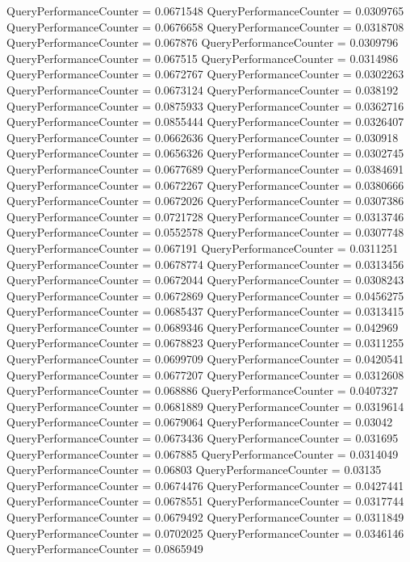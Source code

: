 \documentclass[9pt]{article}
\theoremstyle{plain}
\theoremstyle{definition}
\theoremstyle{remark}
\numberwithin{equation}{section}
\begin{document}
QueryPerformanceCounter  =  0.0671548
QueryPerformanceCounter  =  0.0309765
QueryPerformanceCounter  =  0.0676658
QueryPerformanceCounter  =  0.0318708
QueryPerformanceCounter  =  0.067876
QueryPerformanceCounter  =  0.0309796
QueryPerformanceCounter  =  0.067515
QueryPerformanceCounter  =  0.0314986
QueryPerformanceCounter  =  0.0672767
QueryPerformanceCounter  =  0.0302263
QueryPerformanceCounter  =  0.0673124
QueryPerformanceCounter  =  0.038192
QueryPerformanceCounter  =  0.0875933
QueryPerformanceCounter  =  0.0362716
QueryPerformanceCounter  =  0.0855444
QueryPerformanceCounter  =  0.0326407
QueryPerformanceCounter  =  0.0662636
QueryPerformanceCounter  =  0.030918
QueryPerformanceCounter  =  0.0656326
QueryPerformanceCounter  =  0.0302745
QueryPerformanceCounter  =  0.0677689
QueryPerformanceCounter  =  0.0384691
QueryPerformanceCounter  =  0.0672267
QueryPerformanceCounter  =  0.0380666
QueryPerformanceCounter  =  0.0672026
QueryPerformanceCounter  =  0.0307386
QueryPerformanceCounter  =  0.0721728
QueryPerformanceCounter  =  0.0313746
QueryPerformanceCounter  =  0.0552578
QueryPerformanceCounter  =  0.0307748
QueryPerformanceCounter  =  0.067191
QueryPerformanceCounter  =  0.0311251
QueryPerformanceCounter  =  0.0678774
QueryPerformanceCounter  =  0.0313456
QueryPerformanceCounter  =  0.0672044
QueryPerformanceCounter  =  0.0308243
QueryPerformanceCounter  =  0.0672869
QueryPerformanceCounter  =  0.0456275
QueryPerformanceCounter  =  0.0685437
QueryPerformanceCounter  =  0.0313415
QueryPerformanceCounter  =  0.0689346
QueryPerformanceCounter  =  0.042969
QueryPerformanceCounter  =  0.0678823
QueryPerformanceCounter  =  0.0311255
QueryPerformanceCounter  =  0.0699709
QueryPerformanceCounter  =  0.0420541
QueryPerformanceCounter  =  0.0677207
QueryPerformanceCounter  =  0.0312608
QueryPerformanceCounter  =  0.068886
QueryPerformanceCounter  =  0.0407327
QueryPerformanceCounter  =  0.0681889
QueryPerformanceCounter  =  0.0319614
QueryPerformanceCounter  =  0.0679064
QueryPerformanceCounter  =  0.03042
QueryPerformanceCounter  =  0.0673436
QueryPerformanceCounter  =  0.031695
QueryPerformanceCounter  =  0.067885
QueryPerformanceCounter  =  0.0314049
QueryPerformanceCounter  =  0.06803
QueryPerformanceCounter  =  0.03135
QueryPerformanceCounter  =  0.0674476
QueryPerformanceCounter  =  0.0427441
QueryPerformanceCounter  =  0.0678551
QueryPerformanceCounter  =  0.0317744
QueryPerformanceCounter  =  0.0679492
QueryPerformanceCounter  =  0.0311849
QueryPerformanceCounter  =  0.0702025
QueryPerformanceCounter  =  0.0346146
QueryPerformanceCounter  =  0.0865949
\end{document}
